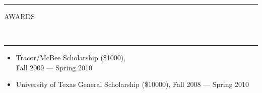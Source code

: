 \documentclass[10pt, letterpaper, oneside]{article}
\newcommand{\HRule}[2]{\textcolor{#1}{\rule{\linewidth}{#2}}}
\newcommand{\sectiontitle}[1]{\begin{minipage}{\textwidth}\HRule{black}{0.25mm}\vspace{-10pt}\begin{center}\Large\MakeUppercase{#1}\end{center}\end{minipage}\\\HRule{light-grey}{0.15mm}\vspace{\baselineskip}}
\newenvironment{tightressection}[1]{
  \begin{minipage}{\textwidth}
  \sectiontitle{#1}}
  {\vspace{\baselineskip}\end{minipage}}
\newenvironment{rescolumn}{
  \begin{minipage}{0.5\textwidth}
    \begin{itemize}[noitemsep,nolistsep]}
  {\end{itemize}
    \end{minipage}}
\newcommand{\resitem}[1]{
    \vspace{2pt}
    \item \begin{flushleft} #1 \end{flushleft}
}
\newcommand{\boardentry}[3]{
  \begin{minipage}{\textwidth}
  \vspace{-9pt}
  \textbf{#1}\\
  \textit{#2}, \textit{#3}\\
  \vspace{0.5\baselineskip}
  \end{minipage}
}
\begin{document}
\begin{tightressection}{awards}
  
  \begin{rescolumn}
      \resitem{Tracor/McBee Scholarship (\$1000), \\ Fall 2009 --- Spring 2010}
    \end{rescolumn}
  \begin{rescolumn}
      \resitem{University of Texas General Scholarship (\$10000), Fall 2008 --- Spring 2010}
    \end{rescolumn}
\end{tightressection}
 
 

 
 

 
\end{document}
